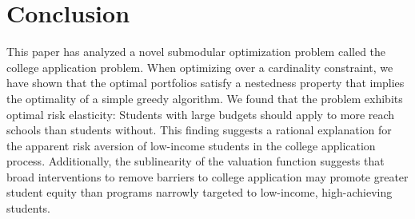 



\section{Conclusion} \label{sectionConclusion}

This paper has analyzed a novel submodular optimization problem called the college application problem. When optimizing over a cardinality constraint, we have shown that the optimal portfolios satisfy a nestedness property that implies the optimality of a simple greedy algorithm. We found that the problem exhibits optimal risk elasticity: Students with large budgets should apply to more reach schools than students without. This finding suggests a rational explanation for the apparent risk aversion of low-income students in the college application process. Additionally, the sublinearity of the valuation function suggests that broad interventions to remove barriers to college application may promote greater student equity than programs narrowly targeted to low-income, high-achieving students.


